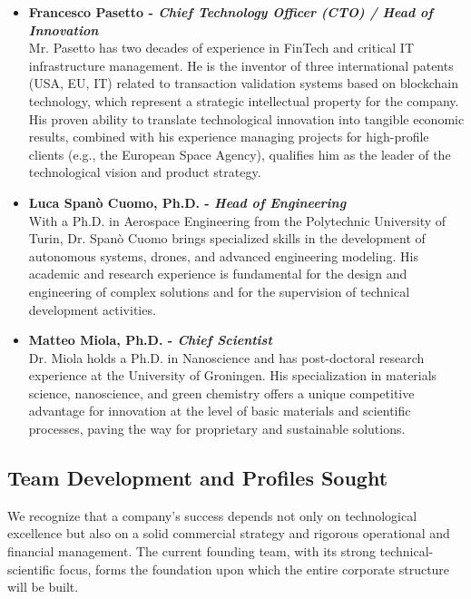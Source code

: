 \documentclass[11pt, a4paper, oneside]{article}
\begin{document}
\begin{itemize}
    \item \textbf{Francesco Pasetto - \textit{Chief Technology Officer (CTO) / Head of Innovation}} \\
    Mr. Pasetto has two decades of experience in FinTech and critical IT infrastructure management. He is the inventor of three international patents (USA, EU, IT) related to transaction validation systems based on blockchain technology, which represent a strategic intellectual property for the company. His proven ability to translate technological innovation into tangible economic results, combined with his experience managing projects for high-profile clients (e.g., the European Space Agency), qualifies him as the leader of the technological vision and product strategy.

    \item \textbf{Luca Spanò Cuomo, Ph.D. - \textit{Head of Engineering}} \\
    With a Ph.D. in Aerospace Engineering from the Polytechnic University of Turin, Dr. Spanò Cuomo brings specialized skills in the development of autonomous systems, drones, and advanced engineering modeling. His academic and research experience is fundamental for the design and engineering of complex solutions and for the supervision of technical development activities.

    \item \textbf{Matteo Miola, Ph.D. - \textit{Chief Scientist}} \\
    Dr. Miola holds a Ph.D. in Nanoscience and has post-doctoral research experience at the University of Groningen. His specialization in materials science, nanoscience, and green chemistry offers a unique competitive advantage for innovation at the level of basic materials and scientific processes, paving the way for proprietary and sustainable solutions.
\end{itemize}

\subsection{Team Development and Profiles Sought}

We recognize that a company's success depends not only on technological excellence but also on a solid commercial strategy and rigorous operational and financial management. The current founding team, with its strong technical-scientific focus, forms the foundation upon which the entire corporate structure will be built.
\end{document}
